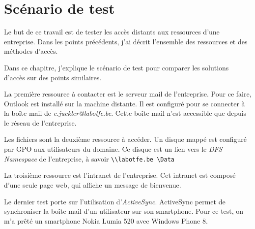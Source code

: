 \section{Scénario de test}
Le but de ce travail est de tester les accès distants aux ressources d'une entreprise.
Dans les points précédents, j'ai décrit l'ensemble des ressources et des méthodes d'accès.

Dans ce chapitre, j'explique le scénario de test pour comparer les solutions d'accès sur des points similaires.

La première ressource à contacter est le serveur mail de l'entreprise. 
Pour ce faire, Outlook est installé sur la machine distante. 
Il est configuré pour se connecter à la boîte mail de \textit{c.juckler@labotfe.be}.
Cette boîte mail n'est accessible que depuis le réseau de l'entreprise.

Les fichiers sont la deuxième ressource à accéder.
Un disque mappé est configuré par GPO aux utilisateurs du domaine. 
Ce disque est un lien vers le \textit{DFS Namespace} de l'entreprise, à savoir \texttt{\textbackslash\textbackslash labotfe.be \textbackslash Data}

La troisième ressource est l'intranet de l'entreprise.
Cet intranet est composé d'une seule page web, qui affiche un message de bienvenue.

Le dernier test porte sur l'utilisation d'\textit{ActiveSync}.
ActiveSync permet de synchroniser la boîte mail d'un utilisateur sur son smartphone.
Pour ce test, on m'a prêté un smartphone Nokia Lumia 520 avec Windows Phone 8.

